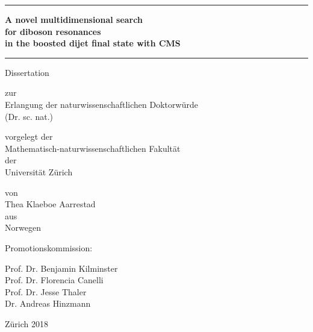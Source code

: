\begin{center}

  \thispagestyle{empty}
  {\parindent0cm
   \rule{\linewidth}{.3ex}}
  \begin{center}

    \bfseries\LARGE
     A novel multidimensional search \\
     for diboson resonances \\
     in the boosted dijet final state with CMS\\
  \end{center}
  \rule{\linewidth}{.3ex}

\par
\vspace{0.6 in}

{\LARGE Dissertation}
\vspace{0.1in}

zur \\
Erlangung der 
naturwissenschaftlichen Doktorw\"urde \\
(Dr. sc. nat.) \\
\par
\vspace{0.6in}


vorgelegt der\\
Mathematisch-naturwissenschaftlichen Fakult\"at \\
der \\
\vspace{0.05in}
{\LARGE Universit\"at Z\"urich}
\par
\vspace{0.3in}


\vspace{0.3in}
von \\
\vspace{0.05in}
{\LARGE Thea Klaeboe Aarrestad} \\
aus \\
Norwegen \\
\par
\vspace{0.6in}


Promotionskommission:\\
\par
\vspace{0.1in}


Prof. Dr. Benjamin Kilminster\\
Prof. Dr. Florencia Canelli\\
Prof. Dr. Jesse Thaler\\
Dr. Andreas Hinzmann\\

\par
\vspace{0.6in}


Z\"urich 2018

\end{center}
